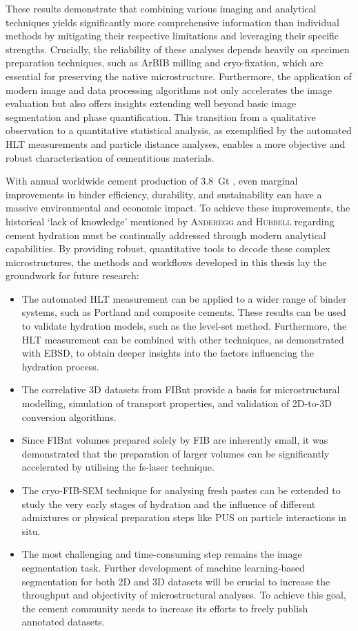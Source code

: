 These results demonstrate that combining various imaging and analytical techniques yields significantly more comprehensive information than individual methods by mitigating their respective limitations and leveraging their specific strengths.
Crucially, the reliability of these analyses depends heavily on specimen preparation techniques, such as \ac{ArBIB} milling and cryo-fixation, which are essential for preserving the native microstructure.
Furthermore, the application of modern image and data processing algorithms not only accelerates the image evaluation but also offers insights extending well beyond basic image segmentation and phase quantification.
This transition from a qualitative observation to a quantitative statistical analysis, as exemplified by the automated \ac{HLT} measurements and particle distance analyses, enables a more objective and robust characterisation of cementitious materials.

With annual worldwide cement production of \qty{3.8}{\giga\tonne} \cite{usgs.2026}, even mar\-gi\-nal improvements in binder efficiency, durability, and sustainability can have a massive environmental and economic impact.
To achieve these improvements, the historical `lack of knowledge' mentioned by \textsc{Anderegg} and \textsc{Hubbell} \cite{anderegg.1929} regarding cement hydration must be continually addressed through modern analytical capabilities.
By providing robust, quantitative tools to decode these complex microstructures, the methods and workflows developed in this thesis lay the groundwork for future research:
\begin{itemize}
    \item The automated \ac{HLT} measurement can be applied to a wider range of binder systems, such as Portland and composite cements. These results can be used to validate hydration models, such as the level-set method. Furthermore, the \ac{HLT} measurement can be combined with other techniques, as demonstrated with \ac{EBSD}, to obtain deeper insights into the factors influencing the hydration process.
    \item The correlative 3D datasets from \ac{FIBnt} provide a basis for microstructural modelling, simulation of transport properties, and validation of 2D-to-3D conversion algorithms.
    \item Since \ac{FIBnt} volumes prepared solely by \ac{FIB} are inherently small, it was demonstrated that the preparation of larger volumes can be significantly accelerated by utilising the \acl{fs-laser} technique.
    \item The cryo-\ac{FIB}-\ac{SEM} technique for analysing fresh pastes can be extended to study the very early stages of hydration and the influence of different admixtures or physical preparation steps like \ac{PUS} on particle interactions in situ.
    \item The most challenging and time-consuming step remains the image segmentation task.
    Further development of machine learning-based segmentation for both 2D and 3D datasets will be crucial to increase the throughput and objectivity of microstructural analyses.
    To achieve this goal, the cement community needs to increase its efforts to freely publish annotated datasets.
\end{itemize}